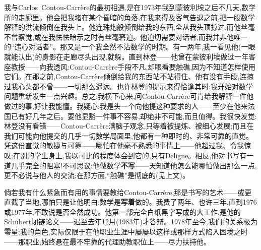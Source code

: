 
我与Carlos~Contou-Carrère的最初相遇,是在1973年我到蒙彼利埃之后不几天,数学所的走廊里。他会把我堵在某个昏暗的角落,在我来得及客气告退之前,把一股数学解释的洪流倾倒在我头上。他连珠炮般倾倒给我的东西,全从我头顶掠过;而他丝毫不曾察觉,或在我怯怯暗示之时有丝毫窘迫。他迫切需要对话者,而我并非他唯一的“违心对话者”。那又是一个我全然不沾数学的时期。有一两年,我一看见他(一眼就能认出)的身影在走廊尽头出现,就躲。直到林登——他曾在蒙彼利埃做过一年客座教授——向我透风:Contou-Carrère手段不凡,却眼看要触礁,因为不知道怎样使用它们。在那之前,Contou-Carrère倾倒给我的东西站不站得住、他有没有手段,连掠过我心头都不曾——一切那么遥远。也许林登的提示来得恰逢其时:我开始对数学问题重新发生一点兴趣。总之,我横下心来,问Contou-Carrère可肯给我解释一件他做过的事,好让我能懂。我疑心:我是头一个向他提这种要求的人——至少在他来法国已有好几年之后。要他显豁一件事不容易,却绝非不可能,而且值得。我很快发觉:林登没有看错——Contou-Carrère满脑子观念,只等着被提炼、被细心发展;而且在我们可能向他提交的几乎一切数学局面里,他都有一种即时的、非常可靠的直觉。凭这份直觉的敏捷与可靠——哪怕在他毫不熟悉的事情上——他超过我、令我惊叹;在别的学生身上,我以可比的程度体会到它的,只有Deligne。相反,他对书写有一道几乎完全的阻塞!不可思议:他做数学\textbf{不写}——天知道他怎么能哪怕做出那么一点,更不必说与他人的交流:在那方面,“触礁”是彻底的(见上文)。

倘若我有什么紧急而有用的事情要教给Contou-Carrère,那是书写的艺术——或更直截了当地,哪怕只是让他明白:数学是\textbf{写着}做的。我费了两年、也许三年,直到1976或1977年,不敢说是否全然成功。他第一部完全白纸黑字写成的大工作,是他的Schubert闭链论文——迟至去年12月(1983年)才答辩。1978年至今,我们的关系极为零星;我的角色,实际仅限于在他职业生涯中屡屡以这样或那样方式陷入困境之时——那职业,始终悬在最不牢靠的代理助教职位上——尽力扶持他。

